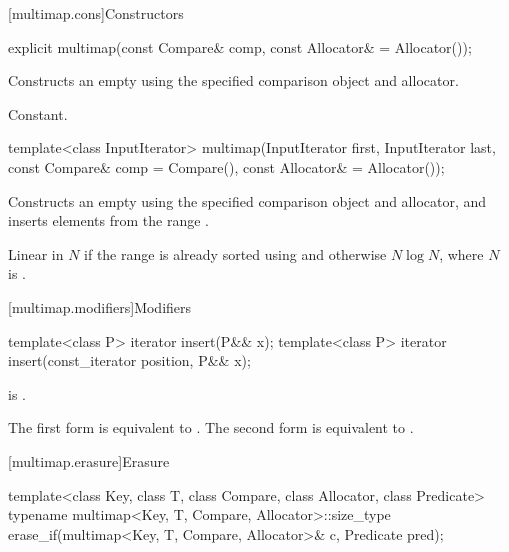 [multimap.cons]{Constructors}

%
\begin{itemdecl}
explicit multimap(const Compare& comp, const Allocator& = Allocator());
\end{itemdecl}

\begin{itemdescr}
\pnum
\effects
Constructs an empty
using the specified comparison object and allocator.

\pnum
\complexity
Constant.
\end{itemdescr}

%
\begin{itemdecl}
template<class InputIterator>
  multimap(InputIterator first, InputIterator last,
           const Compare& comp = Compare(),
           const Allocator& = Allocator());
\end{itemdecl}

\begin{itemdescr}
\pnum
\effects
Constructs an empty
using the specified comparison object and allocator,
and inserts elements from the range
.

\pnum
\complexity
Linear in $N$ if the range
is already sorted using 
and otherwise $N \log N$,
where $N$ is
.
\end{itemdescr}

[multimap.modifiers]{Modifiers}

%
\begin{itemdecl}
template<class P> iterator insert(P&& x);
template<class P> iterator insert(const_iterator position, P&& x);
\end{itemdecl}

\begin{itemdescr}
\pnum
\constraints
{} is .

\pnum
\effects
The first form is equivalent to
. The second form is
equivalent to .
\end{itemdescr}

[multimap.erasure]{Erasure}

%
\begin{itemdecl}
template<class Key, class T, class Compare, class Allocator, class Predicate>
  typename multimap<Key, T, Compare, Allocator>::size_type
    erase_if(multimap<Key, T, Compare, Allocator>& c, Predicate pred);
\end{itemdecl}

